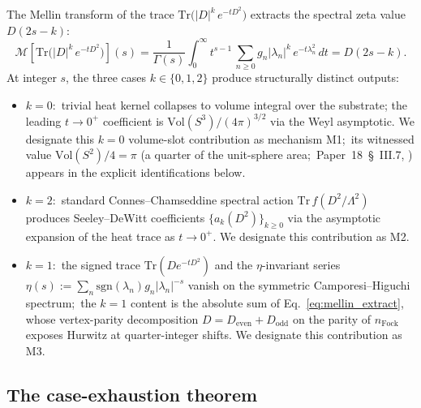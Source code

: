 \documentclass[11pt,a4paper]{article}
\theoremstyle{plain}
\theoremstyle{definition}
\newcommand{\sthree}{S^{3}}
\newcommand{\Vol}{\mathrm{Vol}}
\newcommand{\Tr}{\mathrm{Tr}}
\newcommand{\Mcal}{\mathcal{M}}
\begin{document}
The Mellin transform of the trace
$\Tr\bigl(|D|^k\, e^{-tD^2}\bigr)$ extracts the spectral zeta value
$D(2s - k)$:
\begin{equation}
\label{eq:mellin_extract}
\Mcal\!\left[\Tr\bigl(|D|^k\, e^{-tD^2}\bigr)\right](s)
= \frac{1}{\Gamma(s)} \int_0^\infty t^{s-1} \,
   \sum_{n \ge 0} g_n |\lambda_n|^k\, e^{-t \lambda_n^2}\,dt
= D(2s - k).
\end{equation}
At integer $s$, the three cases $k \in \{0, 1, 2\}$ produce
structurally distinct outputs:
\begin{itemize}
  \item $k = 0$:\ trivial heat kernel collapses to volume integral over
    the substrate; the leading $t \to 0^+$ coefficient is
    $\Vol(\sthree)/(4\pi)^{3/2}$ via the Weyl asymptotic.  We
    designate this $k = 0$ volume-slot contribution as mechanism M1;\
    its witnessed value $\Vol(S^2)/4 = \pi$ (a quarter of the unit-sphere
    area;\ Paper~18~\S~III.7, \cite{loutey_paper18}) appears in the explicit
    identifications below.
  \item $k = 2$:\ standard Connes--Chamseddine spectral action
    $\Tr\,f(D^2/\Lambda^2)$ produces Seeley--DeWitt coefficients
    $\{a_k(D^2)\}_{k \ge 0}$ via the asymptotic expansion of the heat
    trace as $t \to 0^+$.  We designate this contribution as M2.
  \item $k = 1$:\ the signed trace $\Tr(D e^{-tD^2})$ and the
    $\eta$-invariant series
    $\eta(s) := \sum_n \mathrm{sgn}(\lambda_n) g_n |\lambda_n|^{-s}$
    vanish on the symmetric Camporesi--Higuchi spectrum;\ the $k = 1$
    content is the absolute sum of Eq.~\eqref{eq:mellin_extract}, whose
    vertex-parity decomposition
    $D = D_{\mathrm{even}} + D_{\mathrm{odd}}$ on the parity of
    $n_{\mathrm{Fock}}$ exposes Hurwitz at quarter-integer shifts.
    We designate this contribution as M3.
\end{itemize}

\subsection{The case-exhaustion theorem}
\end{document}
